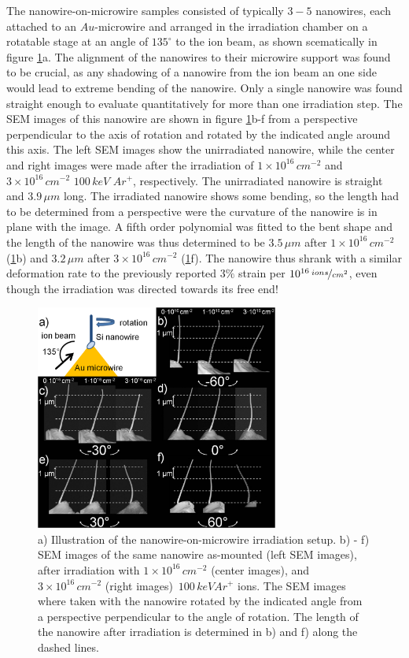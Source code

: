 The nanowire-on-microwire samples consisted of typically $3-5$ nanowires, each attached to an $Au$-microwire and arranged in the irradiation chamber on a rotatable stage at an angle of $135^\circ$ to the ion beam, as shown scematically in figure \ref{reverseangle}a. The alignment of the nanowires to their microwire support was found to be crucial, as any shadowing of a nanowire from the ion beam an one side would lead to extreme bending of the nanowire. Only a single nanowire was found straight enough to evaluate quantitatively for more than one irradiation step. The SEM images of this nanowire are shown in figure \ref{reverseangle}b-f from a perspective perpendicular to the axis of rotation and rotated by the indicated angle around this axis. The left SEM images show the unirradiated nanowire, while the center and right images were made after the irradiation of $1\times10^{16}\,cm^{-2}$ and $3\times10^{16}\,cm^{-2}$ $100\,keV\,\,Ar^+$, respectively. The unirradiated nanowire is straight and $3.9\,\mu m$ long. The irradiated nanowire shows some bending, so the length had to be determined from a perspective were the curvature of the nanowire is in plane with the image. A fifth order polynomial was fitted to the bent shape and the length of the nanowire was thus determined to be $3.5\,\mu m$ after $1\times10^{16}\,cm^{-2}$ (\ref{reverseangle}b) and $3.2\,\mu m$ after $3\times10^{16}\,cm^{-2}$ (\ref{reverseangle}f). The nanowire thus shrank with a similar deformation rate to the previously reported $3\%$ strain per $10^{16}\,\nicefrac{ions}{cm^2}$, even though the irradiation was directed towards its free end!

\begin{figure}[thbp]
	\centering
		\includegraphics[width=8cm]{images/reverseangle.jpg}
	\caption{ a) Illustration of the nanowire-on-microwire irradiation setup. b) - f) SEM images of the same nanowire as-mounted (left SEM images), after irradiation with $1\times10^{16}\,cm^{-2}$  (center images), and $3\times10^{16}\,cm^{-2}$ (right images) $\,100\,keV Ar^+$ ions. The SEM images where taken with the nanowire rotated by the indicated angle from a perspective perpendicular to the angle of rotation. The length of the nanowire after irradiation is determined in b) and f) along the dashed lines.}
	\label{reverseangle}
\end{figure}

